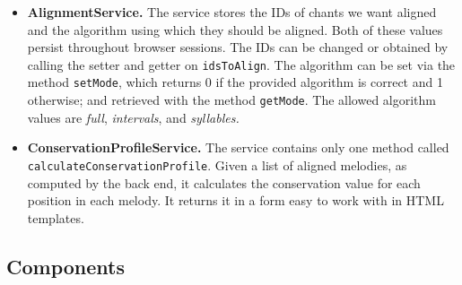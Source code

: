 \begin{itemize}
\item\textbf{AlignmentService.} The service stores the IDs of chants we want aligned and the algorithm using which they should be aligned. Both of these values persist
throughout browser sessions. The IDs can be changed or obtained by calling the setter and getter on \verb|idsToAlign|. The algorithm can be set via the method
\verb|setMode|, which returns 0 if the provided algorithm is correct and 1 otherwise; and retrieved with the method \verb|getMode|. The allowed algorithm values are
\emph{full}, \emph{intervals}, and \emph{syllables.}

\item\textbf{ConservationProfileService.} The service contains only one method called \verb|calculateConservationProfile|. Given a list of aligned melodies, as computed by the back end,
it calculates the conservation value for each position in each melody. It returns it in a form easy to work with in HTML templates.

\end{itemize}

\subsection{Components}


